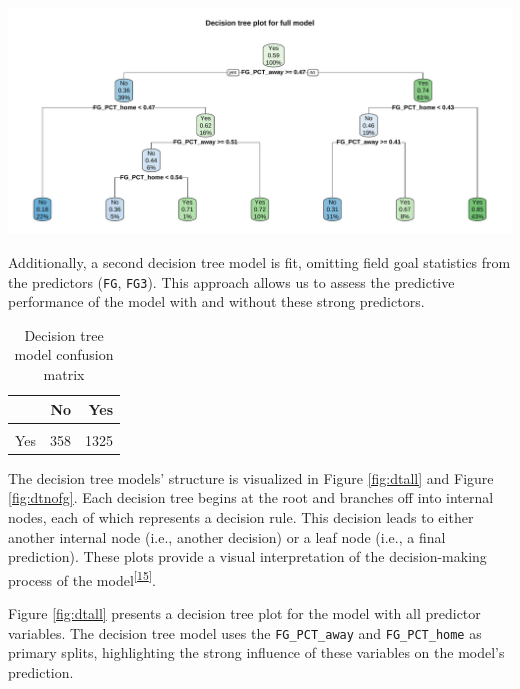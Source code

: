 \documentclass[
  12pt,
  a4paper,
]{article}
\let\origfigure\figure
\let\endorigfigure\endfigure
\renewenvironment{figure}[1][2] {
    \expandafter\origfigure\expandafter[H]
} {
    \endorigfigure
}
\begin{document}
\begin{figure}

{\centering \includegraphics[width=1\linewidth]{latex/plots/plot_7} 

}

\caption{Decision tree plot for model with all variables included}\label{fig:dtall}
\end{figure}

Additionally, a second decision tree model is fit, omitting field goal statistics from the predictors (\texttt{FG}, \texttt{FG3}). This approach allows us to assess the predictive performance of the model with and without these strong predictors.

\begin{table}

\caption{\label{tab:confmatdt}Decision tree model confusion matrix}
\centering
\begin{tabular}[t]{lrr}
\toprule
  & No & Yes\\
\midrule
\cellcolor{gray!30}{No} & \cellcolor{gray!30}{893} & \cellcolor{gray!30}{235}\\
Yes & 358 & 1325\\
\bottomrule
\end{tabular}
\end{table}

The decision tree models' structure is visualized in Figure \ref{fig:dtall} and Figure \ref{fig:dtnofg}. Each decision tree begins at the root and branches off into internal nodes, each of which represents a decision rule. This decision leads to either another internal node (i.e., another decision) or a leaf node (i.e., a final prediction). These plots provide a visual interpretation of the decision-making process of the model\textsuperscript{{[}\protect\hyperlink{ref-rpartplot}{15}{]}}.

Figure \ref{fig:dtall} presents a decision tree plot for the model with all predictor variables. The decision tree model uses the \texttt{FG\_PCT\_away} and \texttt{FG\_PCT\_home} as primary splits, highlighting the strong influence of these variables on the model's prediction.
\end{document}
